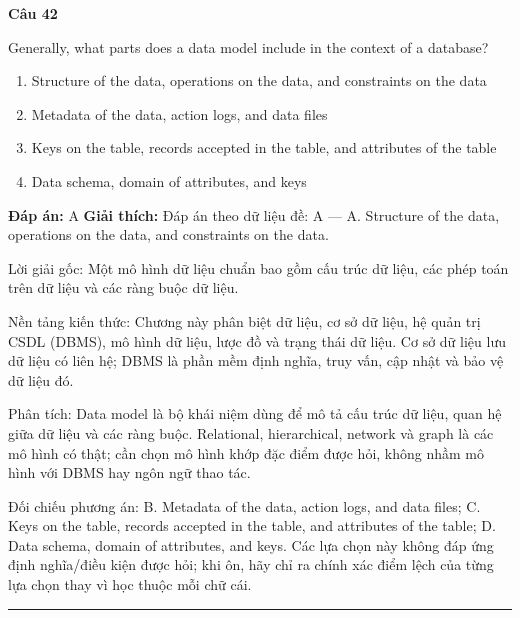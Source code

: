 \documentclass[11pt,a4paper]{article}
\newenvironment{question}[1]{%
  \par\vspace{1em}\noindent\textbf{\large Câu #1}\par\vspace{0.4em}
}{%
  \par\vspace{1em}\hrule\vspace{0.6em}
}
\newenvironment{choices}{%
  \begin{enumerate}[label=\textbf{\Alph*.},leftmargin=2.2em,itemsep=2pt,topsep=3pt]
}{%
  \end{enumerate}
}
\newcommand{\choice}{\item}
\begin{document}
\begin{question}{42}
Generally, what parts does a data model include in the context of a database?
\begin{choices}
\choice Structure of the data, operations on the data, and constraints on the data
\choice Metadata of the data, action logs, and data files
\choice Keys on the table, records accepted in the table, and attributes of the table
\choice Data schema, domain of attributes, and keys
\end{choices}
\textbf{Đáp án:} A
\textbf{Giải thích:} Đáp án theo dữ liệu đề: A — A. Structure of the data, operations on the data, and constraints on the data.

Lời giải gốc: Một mô hình dữ liệu chuẩn bao gồm cấu trúc dữ liệu, các phép toán trên dữ liệu và các ràng buộc dữ liệu.

Nền tảng kiến thức: Chương này phân biệt dữ liệu, cơ sở dữ liệu, hệ quản trị CSDL (DBMS), mô hình dữ liệu, lược đồ và trạng thái dữ liệu. Cơ sở dữ liệu lưu dữ liệu có liên hệ; DBMS là phần mềm định nghĩa, truy vấn, cập nhật và bảo vệ dữ liệu đó.

Phân tích: Data model là bộ khái niệm dùng để mô tả cấu trúc dữ liệu, quan hệ giữa dữ liệu và các ràng buộc. Relational, hierarchical, network và graph là các mô hình có thật; cần chọn mô hình khớp đặc điểm được hỏi, không nhầm mô hình với DBMS hay ngôn ngữ thao tác.

Đối chiếu phương án: B. Metadata of the data, action logs, and data files; C. Keys on the table, records accepted in the table, and attributes of the table; D. Data schema, domain of attributes, and keys. Các lựa chọn này không đáp ứng định nghĩa/điều kiện được hỏi; khi ôn, hãy chỉ ra chính xác điểm lệch của từng lựa chọn thay vì học thuộc mỗi chữ cái.
\end{question}
\end{document}
